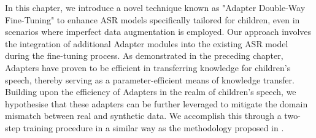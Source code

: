 

In this chapter, we introduce a novel technique known as "Adapter Double-Way Fine-Tuning" to enhance ASR models specifically tailored for children, even in scenarios where imperfect data augmentation is employed. Our approach involves the integration of additional Adapter modules into the existing ASR model during the fine-tuning process. As demonstrated in the preceding chapter, Adapters have proven to be efficient in transferring knowledge for children's speech, thereby serving as a parameter-efficient means of knowledge transfer.
Building upon the efficiency of Adapters in the realm of children's speech, we hypothesise that these adapters can be further leveraged to mitigate the domain mismatch between real and synthetic data. We accomplish this through a two-step training procedure in a similar way as the methodology proposed in \cite{fan2022draft}.

